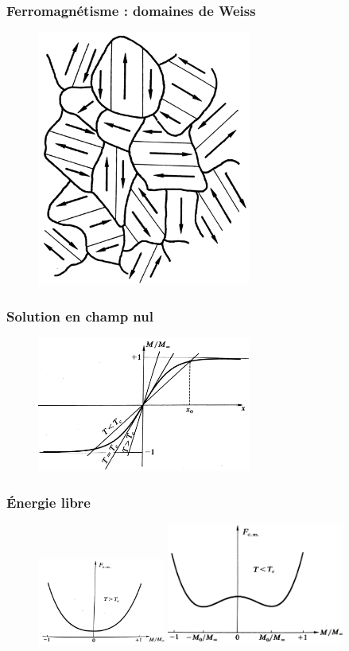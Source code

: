 \documentclass{beamer}
\begin{document}
\begin{frame}
\frametitle{Ferromagnétisme : domaines de Weiss}
\begin{figure}[h]
	\centerline{\includegraphics[width=7cm,angle=90]{weiss}}
\end{figure}
\end{frame}

\begin{frame}
\frametitle{Solution en champ nul}
\begin{figure}
	\centerline{\includegraphics[width=7cm,angle=90]{Mx3}}
\end{figure}
\end{frame}

\begin{frame}
\frametitle{Énergie libre}
\begin{figure}
	\centerline{\includegraphics[width=4.2cm,angle=90]{F_T_sup_Tc}
		\includegraphics[width=5.8cm]{F_T_inf_Tc}}
\end{figure}
\end{frame}
\end{document}
